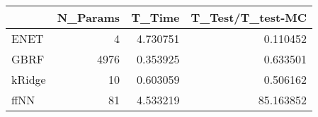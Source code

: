 \begin{tabular}{lrrr}
\toprule
{} &  N\_Params &    T\_Time &  T\_Test/T\_test-MC \\
\midrule
ENET   &         4 &  4.730751 &          0.110452 \\
GBRF   &      4976 &  0.353925 &          0.633501 \\
kRidge &        10 &  0.603059 &          0.506162 \\
ffNN   &        81 &  4.533219 &         85.163852 \\
\bottomrule
\end{tabular}
